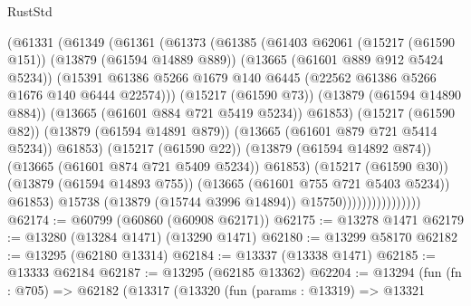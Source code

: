 \begin{lexlean}{RustStd}
\begin{coremodule}
                                  (@61331
                                    (@61349
                                      (@61361
                                        (@61373
                                          (@61385
                                            (@61403
                                              @62061
                                              (@15217 (@61590 @151))
                                              (@13879 (@61594 @14889 @889))
                                              (@13665 (@61601 @889 @912 @5424 @5234))
                                              (@15391
                                                @61386
                                                @5266
                                                @1679
                                                @140
                                                @6445
                                                (@22562 @61386 @5266 @1676 @140 @6444 @22574)))
                                            (@15217 (@61590 @73))
                                            (@13879 (@61594 @14890 @884))
                                            (@13665 (@61601 @884 @721 @5419 @5234))
                                            @61853)
                                          (@15217 (@61590 @82))
                                          (@13879 (@61594 @14891 @879))
                                          (@13665 (@61601 @879 @721 @5414 @5234))
                                          @61853)
                                        (@15217 (@61590 @22))
                                        (@13879 (@61594 @14892 @874))
                                        (@13665 (@61601 @874 @721 @5409 @5234))
                                        @61853)
                                      (@15217 (@61590 @30))
                                      (@13879 (@61594 @14893 @755))
                                      (@13665 (@61601 @755 @721 @5403 @5234))
                                      @61853)
                                    @15738
                                    (@13879 (@15744 @3996 @14894))
                                    @15750))))))))))))))))
@62174 := @60799 (@60860 (@60908 @62171))
@62175 := @13278 @1471
@62179 := @13280 (@13284 @1471) (@13290 @1471)
@62180 := @13299 @58170
@62182 := @13295 (@62180 @13314)
@62184 := @13337 (@13338 @1471)
@62185 := @13333 @62184
@62187 := @13295 (@62185 @13362)
@62204 := @13294
    (fun (fn : @705) =>
    @62182
      (@13317
        (@13320
          (fun (params : @13319) =>
          @13321

\end{coremodule}
\end{lexlean}
